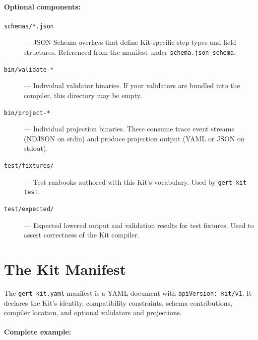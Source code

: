 \paragraph{Optional components:}

\begin{description}
  \item[\texttt{schemas/*.json}] --- JSON Schema overlays that define
    Kit-specific step types and field structures. Referenced from the manifest
    under \texttt{schema.json-schema}.

  \item[\texttt{bin/validate-*}] --- Individual validator binaries. If your
    validators are bundled into the compiler, this directory may be empty.

  \item[\texttt{bin/project-*}] --- Individual projection binaries. These
    consume trace event streams (NDJSON on stdin) and produce projection
    output (YAML or JSON on stdout).

  \item[\texttt{test/fixtures/}] --- Test runbooks authored with this Kit's
    vocabulary. Used by \texttt{gert kit test}.

  \item[\texttt{test/expected/}] --- Expected lowered output and validation
    results for test fixtures. Used to assert correctness of the Kit compiler.
\end{description}

\section{The Kit Manifest}
\label{sec:kit-manifest}

The \texttt{gert-kit.yaml} manifest is a YAML document with \texttt{apiVersion:
kit/v1}. It declares the Kit's identity, compatibility constraints, schema
contributions, compiler location, and optional validators and projections.

\paragraph{Complete example:}

